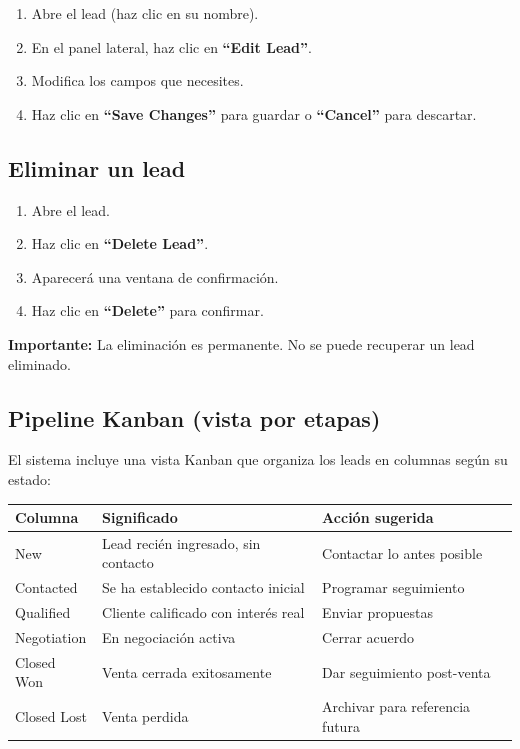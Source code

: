 \documentclass[12pt,oneside]{article}
\begin{document}
\begin{enumerate}[leftmargin=*]
  \item Abre el lead (haz clic en su nombre).
  \item En el panel lateral, haz clic en \textbf{“Edit Lead”}.
  \item Modifica los campos que necesites.
  \item Haz clic en \textbf{“Save Changes”} para guardar o \textbf{“Cancel”} para descartar.
\end{enumerate}

\subsection{Eliminar un lead}

\begin{enumerate}[leftmargin=*]
  \item Abre el lead.
  \item Haz clic en \textbf{“Delete Lead”}.
  \item Aparecerá una ventana de confirmación.
  \item Haz clic en \textbf{“Delete”} para confirmar.
\end{enumerate}

\noindent\textbf{Importante:} La eliminación es permanente. No se puede recuperar un lead eliminado.

\subsection{Pipeline Kanban (vista por etapas)}

El sistema incluye una vista Kanban que organiza los leads en columnas según su estado:

\begin{longtable}{|X|X|X|}
\hline
\rowcolor{primary!10}
\textbf{Columna} & \textbf{Significado} & \textbf{Acción sugerida} \\
\hline
\endhead
New & Lead recién ingresado, sin contacto & Contactar lo antes posible \\
\hline
Contacted & Se ha establecido contacto inicial & Programar seguimiento \\
\hline
Qualified & Cliente calificado con interés real & Enviar propuestas \\
\hline
Negotiation & En negociación activa & Cerrar acuerdo \\
\hline
Closed Won & Venta cerrada exitosamente & Dar seguimiento post-venta \\
\hline
Closed Lost & Venta perdida & Archivar para referencia futura \\
\hline
\end{longtable}
\end{document}
